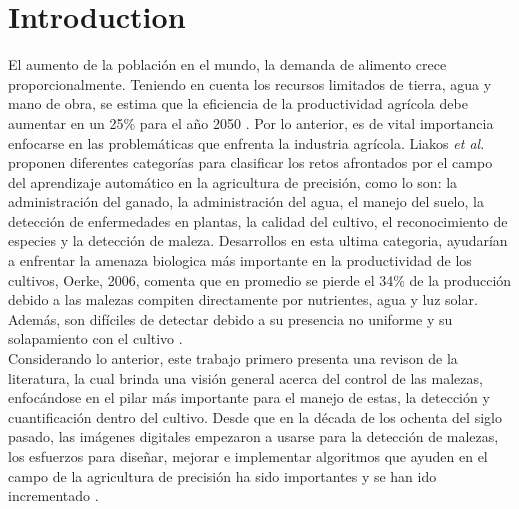 \documentclass[journal,article,submit,moreauthors,pdftex]{Definitions/mdpi}
\begin{document}

\setcounter{section}{-1} %


\section{Introduction}
El aumento de la población en el mundo, la demanda de alimento crece proporcionalmente. Teniendo en cuenta los recursos limitados de tierra, agua y mano de obra, se estima que la eficiencia de la productividad agrícola debe aumentar en un 25\% para el año 2050 \cite{c1}. Por lo anterior, es de vital importancia enfocarse en las problemáticas que enfrenta la industria agrícola. Liakos \textit{et al.} \cite{c6} proponen diferentes categorías para clasificar los retos afrontados por el campo del aprendizaje automático en la agricultura de precisión, como lo son: la administración del ganado, la administración del agua, el manejo del suelo, la detección de enfermedades en plantas, la calidad del cultivo, el reconocimiento de especies y la detección de maleza. Desarrollos en esta ultima categoria, ayudarían a enfrentar la amenaza biologica más importante en la productividad de los cultivos, Oerke, 2006, comenta que en promedio se pierde el 34\% de la producción debido a las malezas compiten directamente por nutrientes, agua y luz solar. Además, son difíciles de detectar debido a su presencia no uniforme y su solapamiento con el cultivo \cite{c2}.
\\
Considerando lo anterior, este trabajo primero presenta una revison de la literatura, la cual brinda una visión general acerca del control de las malezas, enfocándose en el pilar más importante para el manejo de estas, la detección y cuantificación dentro del cultivo. Desde que en la década de los ochenta del siglo pasado, las imágenes digitales empezaron a usarse para la detección de malezas, los esfuerzos para diseñar, mejorar e implementar algoritmos que ayuden en el campo de la agricultura de precisión ha sido importantes y se han ido incrementado \cite{c49} \cite{c47}. 
\end{document}
